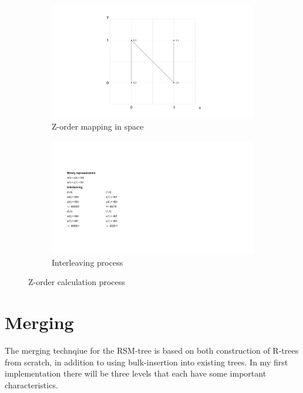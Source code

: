 \begin{figure}[ht]
     \centering
     \begin{subfigure}{0.45\textwidth}
         \centering
         \includegraphics[width=\textwidth]{figures/zorder_process_graph.pdf}
         \caption{Z-order mapping in space}
         \label{fig:zspace}
     \end{subfigure}
     \hfill
      \begin{subfigure}{0.45\textwidth}
     \centering
     \includegraphics[width=\textwidth]{figures/zorder_process_interleaving.pdf}
     \caption{Interleaving process}
     \label{fig:zinterleave}
     \end{subfigure}
    \hfill
    \caption{Z-order calculation process}
    \label{fig:bitInterleaving}
\end{figure}

\section{Merging}
\label{sect:RSM-Merging}
The merging technqiue for the RSM-tree is based on both construction of R-trees from scratch, in addition to using bulk-insertion into existing trees. In my first implementation there will be three levels that each have some important characteristics. 

